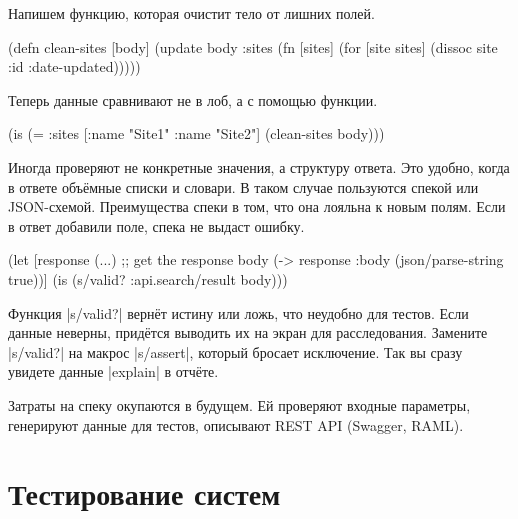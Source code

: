 
\noindent
Напишем функцию, которая очистит тело от лишних полей.

\begin{english}
  \begin{clojure}
(defn clean-sites [body]
  (update body :sites
          (fn [sites]
            (for [site sites]
              (dissoc site :id :date-updated)))))
  \end{clojure}
\end{english}

\noindent
Теперь данные сравнивают не в лоб, а с помощью функции.

\begin{english}
  \begin{clojure}
(is (= {:sites [{:name "Site1"} {:name "Site2"}]}
       (clean-sites body)))
  \end{clojure}
\end{english}

Иногда проверяют не конкретные значения, а структуру ответа. Это удобно, когда в
ответе объёмные списки и словари. В таком случае пользуются спекой или
JSON-схемой. Преимущества спеки в том, что она лояльна к новым полям. Если в
ответ добавили поле, спека не выдаст ошибку.


\begin{english}
  \begin{clojure}
(let [response (...) ;; get the response
      body (-> response :body (json/parse-string true))]
  (is (s/valid? :api.search/result body)))
  \end{clojure}
\end{english}

Функция \spverb|s/valid?| вернёт истину или ложь, что неудобно для тестов. Если
данные неверны, придётся выводить их на экран для расследования. Замените
\spverb|s/valid?| на макрос \spverb|s/assert|, который бросает исключение. Так
вы сразу увидете данные \spverb|explain| в отчёте.


Затраты на спеку окупаются в будущем. Ей проверяют входные параметры, генерируют
данные для тестов, описывают REST API (Swagger, RAML).

\section{Тестирование систем}


